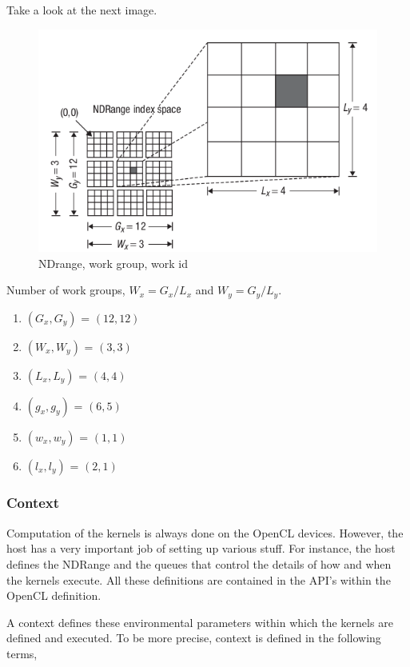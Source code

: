 Take a look at the next image.

\begin{figure}[H]
  \centering
  \includegraphics[scale=0.6]{./images/NDRange.png}
  \caption{NDrange, work group, work id}
  \label{}
\end{figure}

Number of work groups, $W_x=G_x/L_x$ and $W_y=G_y/L_y$.

\begin{enumerate}
	\item $(G_x,G_y)$ = $(12,12)$
	\item $(W_x,W_y)$ = $(3,3)$
	\item $(L_x,L_y)$ = $(4,4)$
	\item $(g_x,g_y)$ = $(6,5)$
	\item $(w_x,w_y)$ = $(1,1)$
	\item $(l_x,l_y)$ = $(2,1)$
\end{enumerate}

\subsubsection{Context} 
Computation of the kernels is always done on the OpenCL devices. However, the host has a very important job of setting up various stuff. For instance, the host defines the NDRange and the queues that control the details of how and when the kernels execute. All these definitions are contained in the API's within the OpenCL definition.

A context defines these environmental parameters within which the kernels are defined and executed. To be more precise, context is defined in the following terms,

